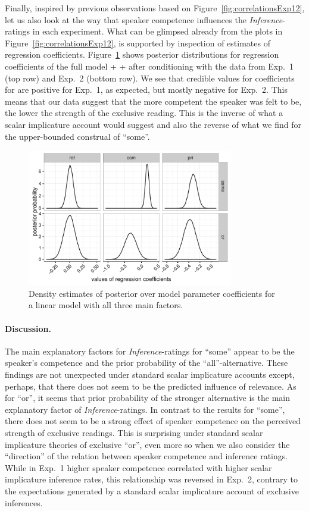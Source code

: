 \documentclass[12pt]{article}
\begin{document}
Finally, inspired by previous observations based on Figure~\ref{fig:correlationsExp12}, let us
also look at the way that speaker competence influences the \emph{Inference}-ratings in each
experiment. What can be glimpsed already from the plots in Figure~\ref{fig:correlationsExp12},
is supported by inspection of estimates of regression
coefficients. Figure~\ref{fig:densityMCMC} shows posterior distributions for regression
coefficients of the full model \rel + \com + \pri after conditioning with the data from Exp.~1
(top row) and Exp.~2 (bottom row). We see that credible values for coefficients for \com are
positive for Exp.~1, as expected, but mostly negative for Exp.~2. This means that our data
suggest that the more competent the speaker was felt to be, the lower the strength of the
exclusive reading. This is the inverse of what a scalar implicature account would suggest and
also the reverse of what we find for the upper-bounded construal of ``some''. 

\begin{figure}
  \centering
  \includegraphics[width=0.8\textwidth]{pics_02/densityMCMCExp12.pdf}
  \caption{Density estimates of posterior over model parameter coefficients for a linear model
    with all three main factors.}
  \label{fig:densityMCMC}
\end{figure}

\paragraph{Discussion.} The main explanatory factors for \emph{Inference}-ratings for ``some''
appear to be the speaker's competence and the prior probability of the ``all''-alternative. These
findings are not unexpected under standard scalar implicature accounts except, perhaps, that
there does not seem to be the predicted influence of relevance. As for ``or'', it seems that
prior probability of the stronger alternative is the main explanatory factor of
\emph{Inference}-ratings. In contrast to the results for ``some'', there does not seem to be a
strong effect of speaker competence on the perceived strength of exclusive readings. This is
surprising under standard scalar implicature theories of exclusive ``or'', even more so when we
also consider the ``direction'' of the relation between speaker competence and inference
ratings. While in Exp.~1 higher speaker competence correlated with higher scalar implicature
inference rates, this relationship was reversed in Exp.~2, contrary to the expectations
generated by a standard scalar implicature account of exclusive inferences.
\end{document}
